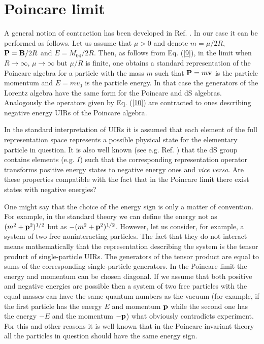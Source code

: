 \documentclass[a4paper,12pt]{article}%
\begin{document}
\section{Poincare limit}
\label{S3}

A general notion of contraction has been developed in 
Ref. \cite{IW}. In our case it can be performed
as follows. Let us assume that $\mu > 0$ and denote
$m=\mu /2R$, ${\bf P}={\bf B}/2R$ and $E=M_{04}/2R$.
Then, as follows from  Eq. (\ref{9}), in the limit
when $R\rightarrow \infty$, $\mu\rightarrow \infty$
but $\mu /R$ is finite,   
one obtains a standard representation of the
Poincare algebra for a particle with the mass $m$ such 
that ${\bf P}=m{\bf v}$ is the particle momentum
and $E=mv_0$ is the particle energy. In that case
the generators of the Lorentz algebra have the same form
for the Poincare and dS algebras. Analogously the
operators given by Eq. (\ref{10}) are contracted to
ones describing negative energy UIRs of the Poincare
algebra.

In the standard interpretation of UIRs
it is assumed that each element of the full 
representation space represents a possible physical
state for the elementary particle in question. 
It is also well known (see e.g. Ref. 
\cite{Dobrev,Men,Moy,Mielke})
that the dS group contains elements (e.g. $I$)
such that the corresponding representation operator
transforms positive energy states to negative energy
ones and {\it vice versa}. Are these properties 
compatible with the fact that in the Poincare
limit there exist states with negative energies?

One might say that the choice of the energy sign is
only a matter of convention. For example, in the
standard theory we can define the energy not as
$(m^2+{\bf p}^2)^{1/2}$ but as 
$-(m^2+{\bf p}^2)^{1/2}$. However, let us consider,
for example, a system of two free noninteracting
particles. The fact that they do not interact means
mathematically that the representation describing
the system is the tensor product of single-particle
UIRs. The generators of the tensor product are equal
to sums of the corresponding single-particle
generators. In the Poincare limit the energy and
momentum can be chosen diagonal. If we assume that
both positive and negative energies are possible 
then a system of two free particles with the equal
masses can have the same quantum numbers as the
vacuum (for example, if the first particle has the
energy $E$ and momentum ${\bf p}$ while the second
one has the energy $-E$ and the momentum $-{\bf p}$)
what obviously contradicts experiment. For this
and other reasons it is well known that in the
Poincare invariant theory all the particles in
question should have the same energy sign.
\end{document}
